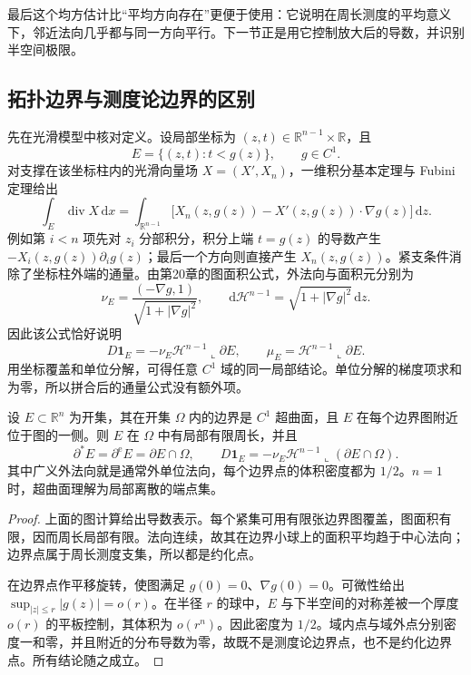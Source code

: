 最后这个均方估计比“平均方向存在”更便于使用：它说明在周长测度的平均意义下，邻近法向几乎都与同一方向平行。下一节正是用它控制放大后的导数，并识别半空间极限。

\subsection{拓扑边界与测度论边界的区别}
\label{g3:subsec:2103:03}
先在光滑模型中核对定义。设局部坐标为 \((z,t)\in\mathbb R^{n-1}\times\mathbb R\)，且
\[
	E=\{(z,t):t<g(z)\},\qquad g\in C^1.
\]
对支撑在该坐标柱内的光滑向量场 \(X=(X',X_n)\)，一维积分基本定理与 Fubini 定理给出
\begin{equation}\label{g3:eq:smooth-graph-distribution-flux}
	\int_E\operatorname{div}X\,\mathrm dx
	=\int_{\mathbb R^{n-1}}
	\bigl[X_n(z,g(z))-X'(z,g(z))\cdot\nabla g(z)\bigr]\,\mathrm dz.
\end{equation}
例如第 \(i<n\) 项先对 \(z_i\) 分部积分，积分上端 \(t=g(z)\) 的导数产生
\(-X_i(z,g(z))\partial_i g(z)\)；最后一个方向则直接产生 \(X_n(z,g(z))\)。紧支条件消除了坐标柱外端的通量。由第20章的图面积公式，外法向与面积元分别为
\[
	\nu_E=\frac{(-\nabla g,1)}{\sqrt{1+|\nabla g|^2}},
	\qquad \mathrm d\mathcal H^{n-1}
	=\sqrt{1+|\nabla g|^2}\,\mathrm dz.
\]
因此该公式恰好说明
\[
	D\mathbf1_E=-\nu_E\mathcal H^{n-1}\llcorner\partial E,
	\qquad \mu_E=\mathcal H^{n-1}\llcorner\partial E.
\]
用坐标覆盖和单位分解，可得任意 \(C^1\) 域的同一局部结论。单位分解的梯度项求和为零，所以拼合后的通量公式没有额外项。

\begin{proposition}\label{g3:prop:smooth-reduced-boundary}
	设 \(E\subset\mathbb R^n\) 为开集，其在开集 \(\Omega\) 内的边界是 \(C^1\) 超曲面，且 \(E\) 在每个边界图附近位于图的一侧。则 \(E\) 在 \(\Omega\) 中有局部有限周长，并且
	\[
		\partial^*E=\partial^{\mathrm e}E=\partial E\cap\Omega,
		\qquad D\mathbf1_E=-\nu_E\mathcal H^{n-1}\llcorner(\partial E\cap\Omega).
	\]
	其中广义外法向就是通常外单位法向，每个边界点的体积密度都为 \(1/2\)。\(n=1\) 时，超曲面理解为局部离散的端点集。
\end{proposition}
\begin{proof}
	上面的图计算给出导数表示。每个紧集可用有限张边界图覆盖，图面积有限，因而周长局部有限。法向连续，故其在边界小球上的面积平均趋于中心法向；边界点属于周长测度支集，所以都是约化点。

	在边界点作平移旋转，使图满足 \(g(0)=0\)、\(\nabla g(0)=0\)。可微性给出
	\(\sup_{|z|\le r}|g(z)|=o(r)\)。在半径 \(r\) 的球中，\(E\) 与下半空间的对称差被一个厚度 \(o(r)\) 的平板控制，其体积为 \(o(r^n)\)。因此密度为 \(1/2\)。域内点与域外点分别密度一和零，并且附近的分布导数为零，故既不是测度论边界点，也不是约化边界点。所有结论随之成立。
\end{proof}

